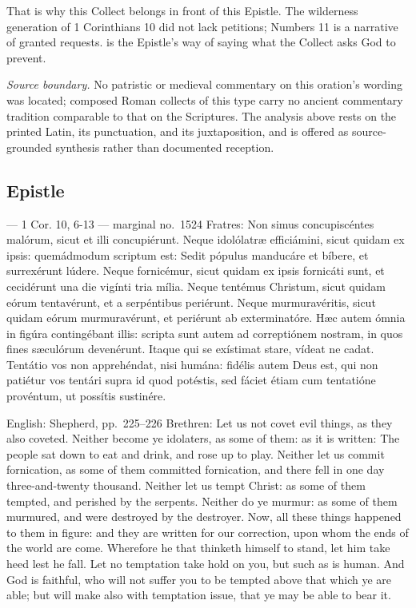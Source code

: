 That is why this Collect belongs in front of this Epistle. The wilderness
generation of 1 Corinthians 10 did not lack petitions; Numbers 11 is a
narrative of granted requests.  is
the Epistle's way of saying what the Collect asks God to prevent.

\textit{Source boundary.} No patristic or medieval commentary on this
oration's wording was located; composed Roman collects of this type carry no
ancient commentary tradition comparable to that on the Scriptures. The
analysis above rests on the printed Latin, its punctuation, and its
juxtaposition, and is offered as source-grounded synthesis rather than
documented reception.

\subsection*{Epistle }

\begin{appointedlatin}{ --- 1 Cor. 10, 6-13 --- marginal no.\ 1524}
Fratres: Non simus concupiscéntes malórum, sicut et illi concupiérunt. Neque
idolólatræ efficiámini, sicut quidam ex ipsis: quemádmodum scriptum est: Sedit
pópulus manducáre et bíbere, et surrexérunt lúdere. Neque fornicémur, sicut
quidam ex ipsis fornicáti sunt, et cecidérunt una die vigínti tria mília.
Neque tentémus Christum, sicut quidam eórum tentavérunt, et a serpéntibus
periérunt. Neque murmuravéritis, sicut quidam eórum murmuravérunt, et
periérunt ab exterminatóre. Hæc autem ómnia in figúra contingébant illis:
scripta sunt autem ad correptiónem nostram, in quos fines sæculórum
devenérunt. Itaque qui se exístimat stare, vídeat ne cadat. Tentátio vos non
apprehéndat, nisi humána: fidélis autem Deus est, qui non patiétur vos tentári
supra id quod potéstis, sed fáciet étiam cum tentatióne provéntum, ut possítis
sustinére.
\end{appointedlatin}

\begin{namedtranslation}{English: Shepherd, pp.~225--226}
Brethren: Let us not covet evil things, as they also coveted. Neither become
ye idolaters, as some of them: as it is written: The people sat down to eat and
drink, and rose up to play. Neither let us commit fornication, as some of them
committed fornication, and there fell in one day three-and-twenty thousand.
Neither let us tempt Christ: as some of them tempted, and perished by the
serpents. Neither do ye murmur: as some of them murmured, and were destroyed by
the destroyer. Now, all these things happened to them in figure: and they are
written for our correction, upon whom the ends of the world are come. Wherefore
he that thinketh himself to stand, let him take heed lest he fall. Let no
temptation take hold on you, but such as is human. And God is faithful, who will
not suffer you to be tempted above that which ye are able; but will make also
with temptation issue, that ye may be able to bear it.
\end{namedtranslation}

